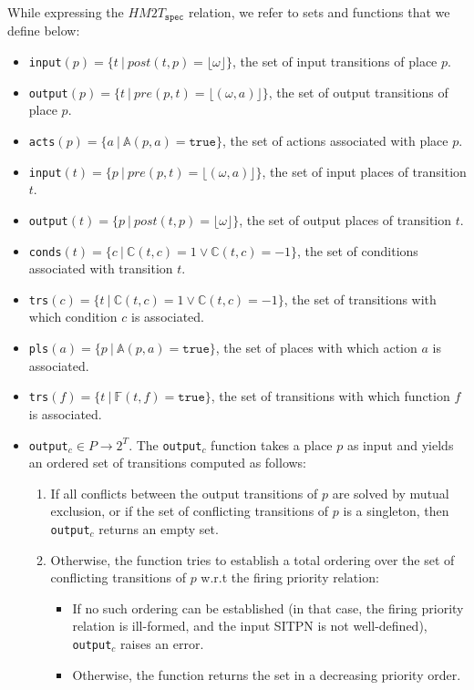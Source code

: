 \bigskip

While expressing the $HM2T_{\mathtt{spec}}$ relation, we refer to sets
and functions that we define below:

\begin{itemize}
\item \texttt{input}$(p)=\{t~\vert~post(t,p)=\lfloor\omega\rfloor\}$,
  the set of input transitions of place $p$.
\item
  \texttt{output}$(p)=\{t~\vert~pre(p,t)=\lfloor(\omega,a)\rfloor\}$,
  the set of output transitions of place $p$.

\item \texttt{acts}$(p)=\{a~\vert~\mathbb{A}(p,a)=\mathtt{true}\}$,
  the set of actions associated with place $p$.
\item
  \texttt{input}$(t)=\{p~\vert~pre(p,t)=\lfloor(\omega,a)\rfloor\}$,
  the set of input places of transition $t$.
\item \texttt{output}$(t)=\{p~\vert~post(t,p)=\lfloor\omega\rfloor\}$,
  the set of output places of transition $t$.
\item
  \texttt{conds}$(t)=\{c~\vert~\mathbb{C}(t,c)=1\lor\mathbb{C}(t,c)=-1\}$,
  the set of conditions associated with transition $t$.
\item
  \texttt{trs}$(c)=\{t~\vert~\mathbb{C}(t,c)=1\lor\mathbb{C}(t,c)=-1\}$,
  the set of transitions with which condition $c$ is associated.
\item \texttt{pls}$(a)=\{p~\vert~\mathbb{A}(p,a)=\mathtt{true}\}$, the
  set of places with which action $a$ is associated.
\item \texttt{trs}$(f)=\{t~\vert~\mathbb{F}(t,f)=\mathtt{true}\}$, the
  set of transitions with which function $f$ is associated.
\end{itemize}

\begin{itemize}
\item \texttt{output}$_c\in{}P\rightarrow{}2^T$.  The
  \texttt{output}$_c$ function takes a place $p$ as input and yields
  an ordered set of transitions computed as follows:
  \begin{enumerate}
  \item If all conflicts between the output transitions of $p$ are
    solved by mutual exclusion, or if the set of conflicting
    transitions of $p$ is a singleton, then \texttt{output}$_c$
    returns an empty set.
  \item Otherwise, the function tries to establish a total ordering
    over the set of conflicting transitions of $p$ w.r.t the firing
    priority relation:
    \begin{itemize}
    \item If no such ordering can be established (in that case, the
      firing priority relation is ill-formed, and the input SITPN is
      not well-defined), \texttt{output}$_c$ raises an error.
    \item Otherwise, the function returns the set in a decreasing
      priority order.
    \end{itemize}
  \end{enumerate}
\end{itemize}

